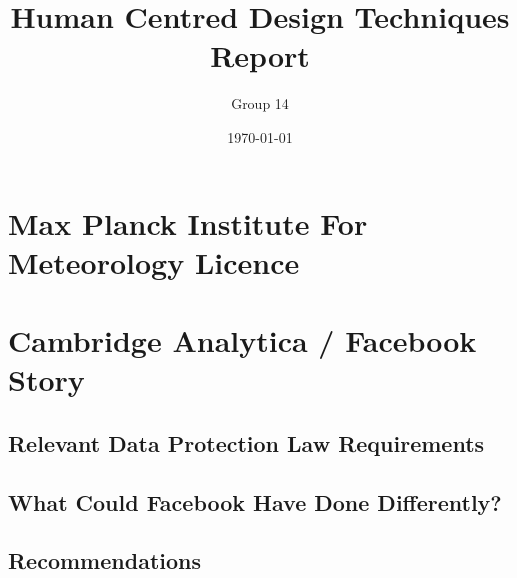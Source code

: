 \documentclass[a4wide, 11pt]{article}
\begin{document}
\title{Human Centred Design Techniques Report}

\author{Group 14}

\date{\today}         %

\maketitle            %

\renewcommand\thesection{\arabic{section}}
\renewcommand\thesubsection{\thesection.\alph{subsection}}

\section{Max Planck Institute For Meteorology Licence}

\section{Cambridge Analytica / Facebook Story}

\subsection{Relevant Data Protection Law Requirements}

\subsection{What Could Facebook Have Done Differently?}

\subsection{Recommendations}
\end{document}
